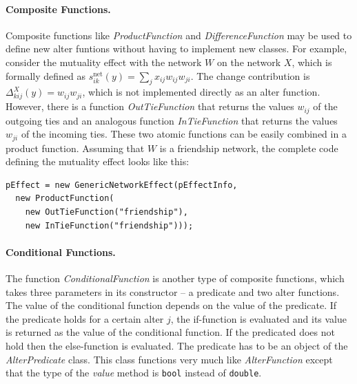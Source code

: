 \documentclass[12pt]{article}
\renewcommand{\=}{\,=\,}
\newcommand{\+}{\,+\,}
\newcommand{\nnm}[1]{\textsf{\small\textit{#1}}}
\begin{document}
\paragraph{Composite Functions.} Composite functions like \nnm{ProductFunction} and \nnm{DifferenceFunction} may
be used to define new alter funtions without having to implement new classes. For example, consider the
mutuality effect with the network $W$ on the network $X$, which is formally defined as
$s_{ik}^\mathrm{net}(y)=\sum_j x_{ij} w_{ij} w_{ji}$. The change contribution is $\Delta_{kij}^X(y)=w_{ij} w_{ji}$,
which is not implemented directly as an alter function. However, there is a function \nnm{OutTieFunction} that
returns the values $w_{ij}$ of the outgoing ties and an analogous function \nnm{InTieFunction} that returns
the values $w_{ji}$ of the incoming ties. These two atomic functions can be easily combined in a product function.
Assuming that $W$ is a friendship network, the complete code defining the mutuality effect looks like this:
\begin{verbatim}
pEffect = new GenericNetworkEffect(pEffectInfo,
  new ProductFunction(
    new OutTieFunction("friendship"),
    new InTieFunction("friendship")));
\end{verbatim}

\paragraph{Conditional Functions.} The function \nnm{ConditionalFunction} is another type of composite
functions, which takes three parameters in its constructor -- a predicate and two alter functions. The
value of the conditional function depends on the value of the predicate. If the predicate holds for
a certain alter $j$, the if-function is evaluated and its value is returned as the value of the conditional
function. If the predicated does not hold then the else-function is evaluated. The predicate has to be an
object of the \nnm{AlterPredicate} class. This class functions very much like \nnm{AlterFunction} except
that the type of the \nnm{value} method is \verb|bool| instead of \verb|double|.
\end{document}
